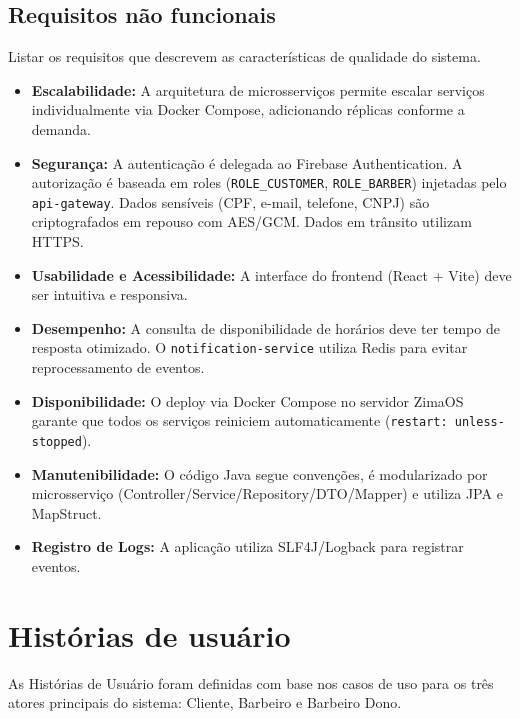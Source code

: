 \documentclass[
    12pt, 
    a4paper, 
    oneside, 
    chapter=TITLE, 
    section=TITLE
]{abntex2}
\begin{document}
\subsection{Requisitos não funcionais}
Listar os requisitos que descrevem as características de qualidade do sistema.
\begin{itemize}
    \item \textbf{Escalabilidade:} A arquitetura de microsserviços permite escalar serviços individualmente via Docker Compose, adicionando réplicas conforme a demanda.
    \item \textbf{Segurança:} A autenticação é delegada ao Firebase Authentication. A autorização é baseada em roles (\texttt{ROLE\_CUSTOMER}, \texttt{ROLE\_BARBER}) injetadas pelo \texttt{api-gateway}. Dados sensíveis (CPF, e-mail, telefone, CNPJ) são criptografados em repouso com AES/GCM. Dados em trânsito utilizam HTTPS.
    \item \textbf{Usabilidade e Acessibilidade:} A interface do frontend (React + Vite) deve ser intuitiva e responsiva.
    \item \textbf{Desempenho:} A consulta de disponibilidade de horários deve ter tempo de resposta otimizado. O \texttt{notification-service} utiliza Redis para evitar reprocessamento de eventos.
    \item \textbf{Disponibilidade:} O deploy via Docker Compose no servidor ZimaOS garante que todos os serviços reiniciem automaticamente (\texttt{restart: unless-stopped}).
    \item \textbf{Manutenibilidade:} O código Java segue convenções, é modularizado por microsserviço (Controller/Service/Repository/DTO/Mapper) e utiliza JPA e MapStruct.
    \item \textbf{Registro de Logs:} A aplicação utiliza SLF4J/Logback para registrar eventos.
\end{itemize}

\section{Histórias de usuário}
As Histórias de Usuário foram definidas com base nos casos de uso para os três atores principais do sistema: Cliente, Barbeiro e Barbeiro Dono.
\end{document}

